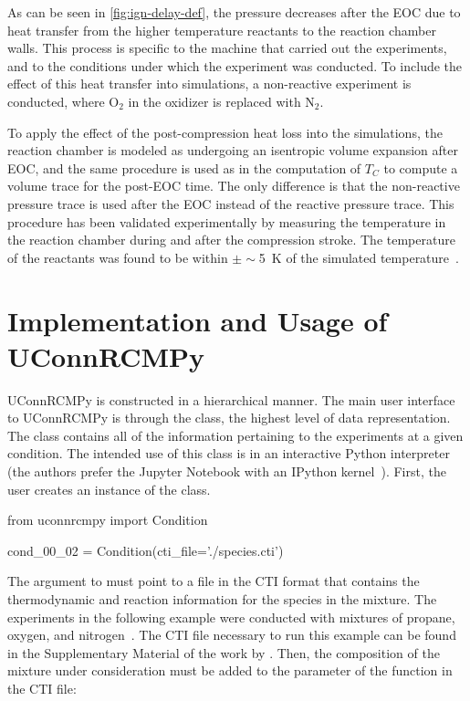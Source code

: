 \documentclass[12pt]{../ussci}
\begin{document}
As can be seen in \cref{fig:ign-delay-def}, the pressure
decreases after the EOC due to heat transfer from the higher temperature
reactants to the reaction chamber walls. This process is specific to the
machine that carried out the experiments, and to the conditions under
which the experiment was conducted. To include the effect of this heat
transfer into simulations, a non-reactive experiment is conducted, where
\(\text{O}_2\) in the oxidizer is replaced with \(\text{N}_2\).

To apply the effect of the post-compression heat loss into the simulations, the
reaction chamber is modeled as undergoing an isentropic volume expansion after
EOC, and the same procedure is used as in the computation of \(T_C\) to compute
a volume trace for the post-EOC time. The only difference is that the
non-reactive pressure trace is used after the EOC instead of the reactive
pressure trace. This procedure has been validated experimentally by measuring
the temperature in the reaction chamber during and after the compression stroke.
The temperature of the reactants was found to be within $\pm\sim $\SI{5}{\K} of
the simulated temperature~\autocite{Das2012a,Uddi2012}.

\section{Implementation and Usage of UConnRCMPy}\label{implementation-and-usage-of-uconnrcmpy}

UConnRCMPy is constructed in a hierarchical manner. The main user interface to
UConnRCMPy is through the  class, the highest level of data
representation. The  class contains all of the information
pertaining to the experiments at a given condition. The intended use of this
class is in an interactive Python interpreter (the authors prefer the Jupyter
Notebook with an IPython kernel~\autocite{Perez2007}). First, the user creates
an instance of the  class.

\begin{pythonbox}
from uconnrcmpy import Condition

cond_00_02 = Condition(cti_file='./species.cti')
\end{pythonbox}

The  argument to  must point to a file in the
CTI format that contains the thermodynamic and reaction information for the
species in the mixture. The experiments in the following example were conducted
with mixtures of propane, oxygen, and nitrogen~\autocite{Dames2016}. The CTI
file necessary to run this example can be found in the Supplementary Material of
the work by \textcite{Dames2016}. Then, the composition of the mixture under
consideration must be added to the  parameter of the
 function in the CTI file:
\end{document}
